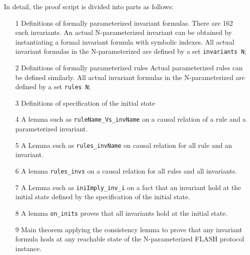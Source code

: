 \documentclass{llncs}
\begin{document}
In detail, the proof script is divided into   parts as follows:
\begin{enumerate}
\item[1] Definitions of formally parameterized invariant formulas.%
    There are 162 such invariants. An actual N-parameterized invariant can be obtained by instantiating a formal invariant formula with symbolic indexes. All   actual invariant formulas in the N-parameterized are defined by a set {\tt invariants N};

\item[2] Definitions of formally parameterized rules%
    Actual parameterized rules can be defined similarly. All actual invariant formulas in the N-parameterized are defined by a set {\tt rules N};

\item[3]  Definitions of specification of the initial state%

\item[4] A lemma  such as {\tt ruleName\_Vs\_invName} on a causal relation of a rule and a parameterized invariant. %


\item[5]  A  Lemma  such as {\tt rules\_invName} on causal relation for  all rule and an invariant.%


\item[6] A lemma {\tt rules\_invs} on a causal relation for all rules and all invariants. %

\item[7] A Lemma such as {\tt iniImply\_inv\_i} on a fact that an invariant  hold at the initial state defined by the specification of the initial state. %

\item[8] A lemma {\tt on\_inits} proves that  all invariants hold at the initial state. %

\item[9] Main theorem  applying the consistency lemma to prove that any invariant formula  hods at any reachable state of the  N-parameterized FLASH protocol instance.
\end{enumerate}
\end{document}
